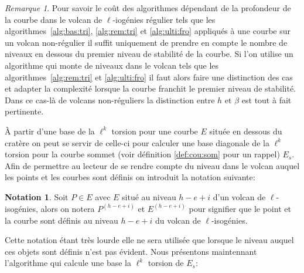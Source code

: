 \documentclass[10pt,a4paper]{book}
\theoremstyle{plain}
\theoremstyle{definition}
\theoremstyle{definition}
\theoremstyle{definition}
\theoremstyle{definition}
\theoremstyle{remark}
\newtheorem{rem}[thm]{Remarque}
\theoremstyle{remark}
\theoremstyle{definition}
\newtheorem{nota}[thm]{Notation}
\begin{document}
\begin{rem}
Pour savoir le coût des algorithmes dépendant de la profondeur de la courbe dans le volcan de $\ell$-iogénies régulier tels que les algorithmes~\ref{alg:bas:tri}, \ref{alg:rem:tri} et \ref{alg:ulti:fro}  appliqués à une courbe sur un volcan non-régulier il suffit uniquement de prendre en compte le nombre de niveaux en dessous du premier niveau de stabilité de la courbe. Si l'on utilise un algorithme qui monte de niveaux dans le volcan tels que les algorithmes~\ref{alg:rem:tri} et \ref{alg:ulti:fro} il faut alors faire une distinction des cas et adapter la complexité lorsque la courbe franchit le premier niveau de stabilité. Dans ce cas-là de volcans non-réguliers la distinction entre $h$ et $\beta$ est tout à fait pertinente.
\end{rem}

\`A partir d'une base de la $\ell^k$ torsion pour une courbe $E$ située en dessous du cratère on peut se servir de celle-ci pour calculer une base diagonale de la $\ell^k$ torsion pour la courbe sommet (voir définition \ref{def:cou:som} pour un rappel) $E_s$. Afin de permettre au lecteur de se rendre compte du niveau dans le volcan auquel les points et les courbes sont définis on introduit la notation suivante:
\begin{nota}
Soit $P \in E$ avec $E$ situé au niveau $h-e+i$ d'un volcan de $\ell$-isogénies, alors on notera $P^{(h-e+i)}$ et $E^{(h-e+i)}$ pour signifier que le point et la courbe sont définis au niveau $h-e+i$ du volcan de $\ell$-isogénies.
\end{nota}
Cette notation étant très lourde elle ne sera utilisée que lorsque le niveau auquel ces objets sont définis n'est pas évident.
 Nous présentons maintennant l'algorithme qui calcule une base la $\ell^k$ torsion de $E_s$:
\end{document}
